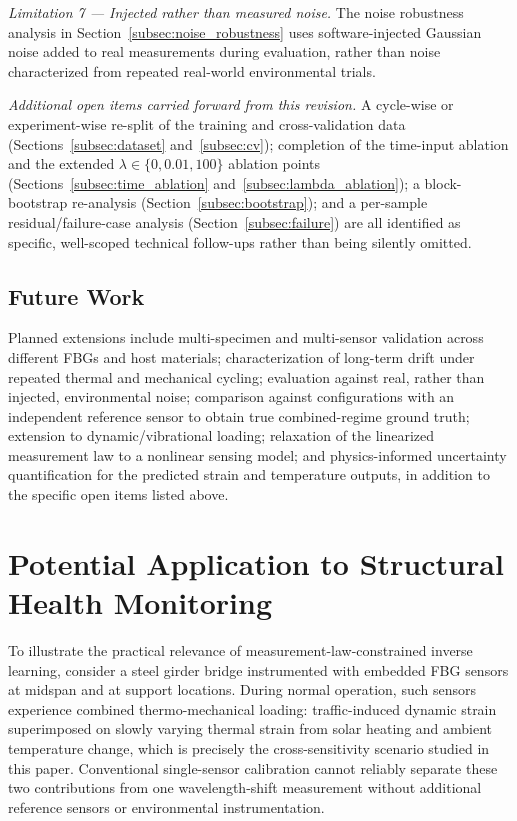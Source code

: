 \documentclass[journal,twoside,web]{ieeecolor}
\begin{document}
\emph{Limitation 7 --- Injected rather than measured noise.} The noise
robustness analysis in Section~\ref{subsec:noise_robustness} uses
software-injected Gaussian noise added to real measurements during
evaluation, rather than noise characterized from repeated real-world
environmental trials.

\emph{Additional open items carried forward from this revision.} A
cycle-wise or experiment-wise re-split of the training and cross-validation
data (Sections~\ref{subsec:dataset} and~\ref{subsec:cv}); completion of the
time-input ablation and the extended $\lambda\in\{0,0.01,100\}$ ablation
points (Sections~\ref{subsec:time_ablation}
and~\ref{subsec:lambda_ablation}); a block-bootstrap re-analysis
(Section~\ref{subsec:bootstrap}); and a per-sample residual/failure-case
analysis (Section~\ref{subsec:failure}) are all identified as specific,
well-scoped technical follow-ups rather than being silently omitted.

\subsection*{Future Work}

Planned extensions include multi-specimen and multi-sensor validation across
different FBGs and host materials; characterization of long-term drift under
repeated thermal and mechanical cycling; evaluation against real, rather
than injected, environmental noise; comparison against configurations with
an independent reference sensor to obtain true combined-regime ground
truth; extension to dynamic/vibrational loading; relaxation of the
linearized measurement law to a nonlinear sensing model; and
physics-informed uncertainty quantification for the predicted strain and
temperature outputs, in addition to the specific open items listed above.


\section{Potential Application to Structural Health Monitoring}
\label{sec:application}

To illustrate the practical relevance of measurement-law-constrained
inverse learning, consider a steel girder bridge instrumented with embedded
FBG sensors at midspan and at support locations. During normal operation,
such sensors experience combined thermo-mechanical loading: traffic-induced
dynamic strain superimposed on slowly varying thermal strain from solar
heating and ambient temperature change, which is precisely the
cross-sensitivity scenario studied in this paper. Conventional single-sensor
calibration cannot reliably separate these two contributions from one
wavelength-shift measurement without additional reference sensors or
environmental instrumentation.
\end{document}

